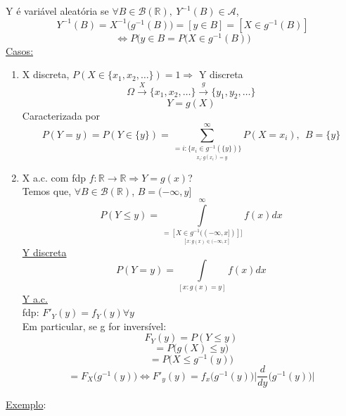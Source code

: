 \documentclass[a4paper,12pt]{article}
\begin{document}
Y é variável aleatória se $\forall B \in \mathscr{B}(\mathbb{R}), \ Y^{-1}(B)\in \mathscr A$,
$$Y^{-1}(B)= X^{-1}\bigg( g^{-1}(B)\bigg)=[y\in B]= [X\in g^{-1}(B)] $$
$$\Leftrightarrow P(y\in B = P\bigg( X\in g^{-1}(B)\bigg) $$
\underline{Casos:}
	\begin{enumerate}[label=\alph*)]
		\item X discreta, $P(X\in \{x_1,x_2,\ldots\})=1\Rightarrow$ Y discreta
		$$\Omega \overset{X}{\longrightarrow} \{x_1,x_2,\ldots\} \overset{g}{\longrightarrow} \{y_1,y_2,\ldots\} $$
		$$Y=g(X) $$
		Caracterizada por
		$$P(Y=y)=P(Y\in \{y\}) = \sum\limits_{=\underset{x_i:g(x_i)=y}{i:\{x_i \in g^{-1}(\{y\}) \}}}^{\infty}P(X=x_i), \ \ B=\{y\} $$
		
		\item 
		
		X a.c. com fdp $f:\mathbb R \longrightarrow \mathbb R \Rightarrow Y=g(x)$?\\
		Temos que, $\forall B\in \mathscr{B}(\mathbb{R}) $, $B=(-\infty,y]$
		$$P(Y\le y) = \int\limits_{=\underset{[x:g(x)\in (-\infty,x]}{[X \in g^{-1}((-\infty,x])]] }}^{\infty}f(x)dx$$ 
		\underline{Y discreta}
		$$P(Y=y)=\int\limits_{[x:g(x)=y]}f(x)dx $$
		\underline{Y a.c.}\\
		fdp:  $F'_Y(y) = f_Y(y) \forall y $\\
		Em particular, se g for inversível:
		$$F_Y(y)=P(Y\le y) $$
		$$=P\bigg( g(X) \le y \bigg) $$
		$$=P\bigg(X \le g^{-1}(y) \bigg)$$
		$$=F_X\bigg( g^{-1}(y)\bigg) \Leftrightarrow F'_y(y) = f_x\bigg(g^{-1}(y)\bigg)\bigg|\frac{d}{dy}\bigg(g^{-1}(y)\bigg) \bigg|$$
	\end{enumerate}
\newpage
\underline{Exemplo}:\\
\end{document}
